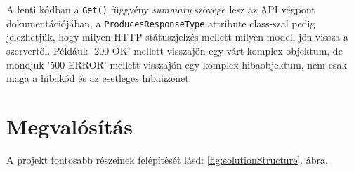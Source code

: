 \documentclass[twoside, a4paper, 12pt]{book}
\begin{document}
A fenti kódban a \texttt{Get()} függvény \textit{summary} szövege lesz az API végpont dokumentációjában, a \texttt{ProducesResponseType} attribute class-szal pedig jelezhetjük, hogy milyen HTTP státuszjelzés mellett milyen modell jön vissza a szervertől. Például: '200 OK' mellett visszajön egy várt komplex objektum, de mondjuk '500 ERROR' mellett visszajön egy komplex hibaobjektum, nem csak maga a hibakód és az esetleges hibaüzenet.










































\newpage
\chapter{Megvalósítás}
\noindent A projekt fontosabb részeinek felépítését lásd: \ref{fig:solutionStructure}. ábra.
\end{document}
